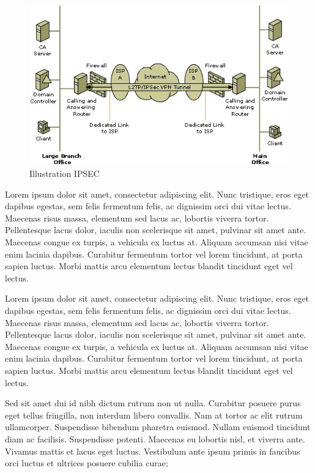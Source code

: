 \documentclass{report}
\begin{document}
\begin{figure}[!h]
\centering
\includegraphics[width=15cm]{./images/images/illustrationipsec}
\caption{Illustration IPSEC}
\end{figure}

Lorem ipsum dolor sit amet, consectetur adipiscing elit. Nunc tristique, eros eget dapibus egestas, sem felis fermentum felis, ac dignissim orci dui vitae lectus. Maecenas risus massa, elementum sed lacus ac, lobortis viverra tortor. Pellentesque lacus dolor, iaculis non scelerisque sit amet, pulvinar sit amet ante. Maecenas congue ex turpis, a vehicula ex luctus at. Aliquam accumsan nisi vitae enim lacinia dapibus. Curabitur fermentum tortor vel lorem tincidunt, at porta sapien luctus. Morbi mattis arcu elementum lectus blandit tincidunt eget vel lectus.

Lorem ipsum dolor sit amet, consectetur adipiscing elit. Nunc tristique, eros eget dapibus egestas, sem felis fermentum felis, ac dignissim orci dui vitae lectus. Maecenas risus massa, elementum sed lacus ac, lobortis viverra tortor. Pellentesque lacus dolor, iaculis non scelerisque sit amet, pulvinar sit amet ante. Maecenas congue ex turpis, a vehicula ex luctus at. Aliquam accumsan nisi vitae enim lacinia dapibus. Curabitur fermentum tortor vel lorem tincidunt, at porta sapien luctus. Morbi mattis arcu elementum lectus blandit tincidunt eget vel lectus.

Sed sit amet dui id nibh dictum rutrum non ut nulla. Curabitur posuere purus eget tellus fringilla, non interdum libero convallis. Nam at tortor ac elit rutrum ullamcorper. Suspendisse bibendum pharetra euismod. Nullam euismod tincidunt diam ac facilisis. Suspendisse potenti. Maecenas eu lobortis nisl, et viverra ante. Vivamus mattis et lacus eget luctus. Vestibulum ante ipsum primis in faucibus orci luctus et ultrices posuere cubilia curae;
\end{document}
